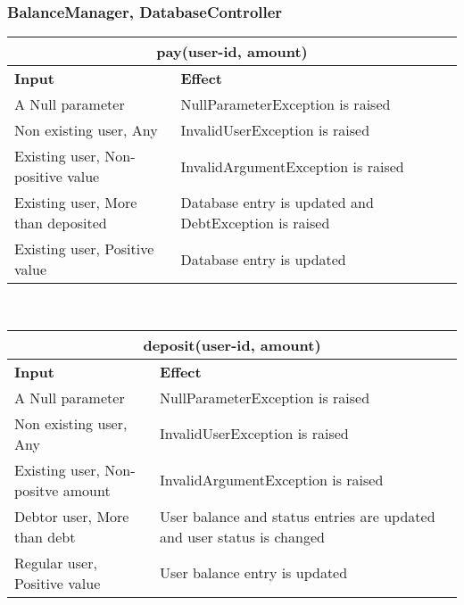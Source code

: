 \subsubsection{BalanceManager, DatabaseController}
\begin{tabular}{|p{5cm}|p{7cm}|}
\hline
\multicolumn{2}{|c|}{pay(user-id, amount)} \\
\hline
\textbf{Input} & \textbf{Effect} \\

\hline
A Null parameter & NullParameterException is raised \\

\hline
Non existing user, Any & InvalidUserException is raised \\

\hline
Existing user, Non-positive value & InvalidArgumentException is raised \\

\hline
Existing user, More than deposited & Database entry is updated and DebtException is raised \\

\hline
Existing user, Positive value & Database entry is updated \\
\hline
\end{tabular}
\\
\begin{tabular}{|p{5cm}|p{7cm}|}
\hline
\multicolumn{2}{|c|}{deposit(user-id, amount)} \\
\hline
\textbf{Input} & \textbf{Effect} \\

\hline
A Null parameter & NullParameterException is raised \\

\hline
Non existing user, Any & InvalidUserException is raised \\

\hline
Existing user, Non-positve amount & InvalidArgumentException is raised \\

\hline
Debtor user, More than debt & User balance and status entries are updated and user status is changed \\

\hline
Regular user, Positive value & User balance entry is updated \\
\hline

\hline
\end{tabular}

